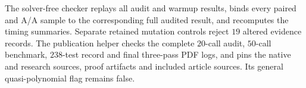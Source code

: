 The solver-free checker replays all audit and warmup results, binds every
paired and A/A sample to the corresponding full audited result, and
recomputes the timing summaries.  Separate retained mutation controls
reject $19$ altered evidence records.  The publication helper
 checks the complete $20$-call
audit, $50$-call benchmark, $238$-test record and final three-pass PDF logs,
and pins the native and research sources, proof artifacts and included
article sources.  Its general quasi-polynomial flag remains false.
